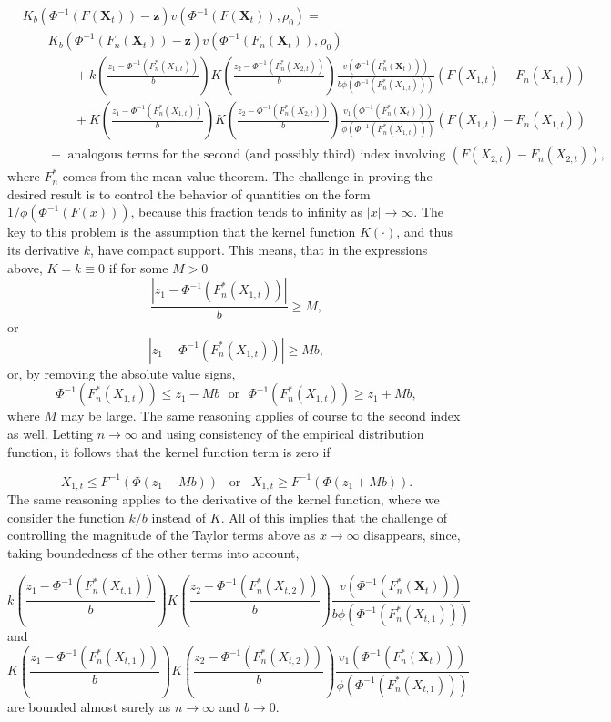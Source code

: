 \documentclass[
  12pt,
  letterpaper]{article}
\numberwithin{equation}{section}
\newcommand{\X}{\bm{X}}
\newcommand{\z}{\bm{z}}
\begin{document}
\begin{align*}
& K_b\left(\Phi^{-1}(F(\X_t)) - \z\right)v\left(\Phi^{-1}(F(\X_t)), \rho_0\right) = \\
& \qquad K_b\left(\Phi^{-1}(F_n(\X_t)) - \z\right)v\left(\Phi^{-1}(F_n(\X_t)), \rho_0\right) \\
& \qquad\qquad + k\left(\frac{z_1 - \Phi^{-1}(F_n^*(X_{1,t}))}{b}\right) K\left(\frac{z_2 - \Phi^{-1}(F_n^*(X_{2,t}))}{b}\right) \frac{v(\Phi^{-1}(F_n^*(\X_t)))}{b\phi(\Phi^{-1}(F_n^*(X_{1,t})))}\left(F(X_{1,t}) - F_n(X_{1,t})\right) \\
& \qquad\qquad + K\left(\frac{z_1 - \Phi^{-1}(F_n^*(X_{1,t}))}{b}\right) K\left(\frac{z_2 - \Phi^{-1}(F_n^*(X_{2,t}))}{b}\right) \frac{v_1(\Phi^{-1}(F_n^*(\bm{X}_t)))}{\phi(\Phi^{-1}(F_n^*(X_{1,t})))}\left(F(X_{1,t}) - F_n(X_{1,t})\right) \\
&\qquad + \textrm{ analogous terms for the second (and possibly third) index involving } \left(F(X_{2,t}) - F_n(X_{2,t})\right), 
\end{align*}
where \(F_n^*\) comes from the mean value theorem. The challenge in proving the desired result is to control the behavior of quantities on the form \(1/\phi(\Phi^{-1}(F(x)))\), because this fraction tends to infinity as \(|x| \rightarrow \infty\). The key to this problem is the assumption that the kernel function \(K(\cdot)\), and thus its derivative \(k\), have compact support. This means, that in the expressions above, \(K = k \equiv 0\) if for some \(M > 0\)
\[\frac{|z_1 - \Phi^{-1}(F_n^*(X_{1,t}))|}{b} \geq M,\]
or
\[|z_1 - \Phi^{-1}(F_n^*(X_{1,t}))| \geq Mb,\]
or, by removing the absolute value signs,
\[ \Phi^{-1}(F_n^*(X_{1,t})) \leq z_1 - Mb\,\, \textrm{ or }\,\, \Phi^{-1}(F_n^*(X_{1,t})) \geq z_1 + Mb,\]
where \(M\) may be large. The same reasoning applies of course to the second index as well. Letting \(n\rightarrow\infty\) and using consistency of the empirical distribution function, it follows that the kernel function term is zero if

\[X_{1,t} \leq F^{-1}(\Phi(z_1 - Mb)) \,\,\, \textrm{ or } \,\,\, X_{1,t} \geq F^{-1}(\Phi(z_1 + Mb)).\]
The same reasoning applies to the derivative of the kernel function, where we consider the function \(k/b\) instead of \(K\). All of this implies that the challenge of controlling the magnitude of the Taylor terms above as \(x\rightarrow\infty\) disappears, since, taking boundedness of the other terms into account,

\[ k\left(\frac{z_1 - \Phi^{-1}(F_n^*(X_{t,1}))}{b}\right) K\left(\frac{z_2 - \Phi^{-1}(F_n^*(X_{t, 2}))}{b}\right) \frac{v(\Phi^{-1}(F_n^*(\X_t)))}{b\phi(\Phi^{-1}(F_n^*(X_{t,1})))}\]
and
\[K\left(\frac{z_1 - \Phi^{-1}(F_n^*(X_{t,1}))}{b}\right) K\left(\frac{z_2 - \Phi^{-1}(F_n^*(X_{t, 2}))}{b}\right) \frac{v_1(\Phi^{-1}(F_n^*(\X_t)))}{\phi(\Phi^{-1}(F_n^*(X_{t,1})))}\]
are bounded almost surely as \(n\rightarrow\infty\) and \(b\rightarrow 0\).
\end{document}
